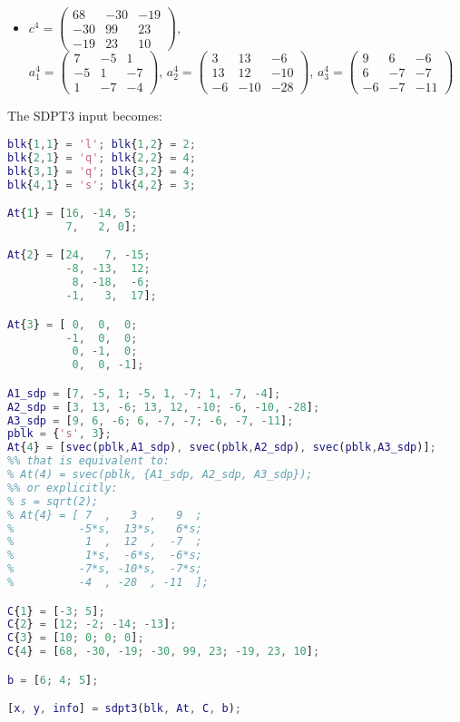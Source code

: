 \begin{example}
\begin{itemize}
    \item $c^4 = \begin{pmatrix} 68 & -30 & -19 \\ -30 & 99 & 23 \\ -19 & 23 & 10 \end{pmatrix}$, \\
    $a^4_1 = \begin{pmatrix} 7 & -5 & 1 \\ -5 & 1 & -7 \\ 1 & -7 & -4 \end{pmatrix}$, 
    $a^4_2 = \begin{pmatrix} 3 & 13 & -6 \\ 13 & 12 & -10 \\ -6 & -10 & -28 \end{pmatrix}$, 
    $a^4_3 = \begin{pmatrix} 9 & 6 & -6 \\ 6 & -7 & -7 \\ -6 & -7 & -11 \end{pmatrix}$
\end{itemize}

The SDPT3 input becomes:
\begin{lstlisting}[language=Matlab]
blk{1,1} = 'l'; blk{1,2} = 2;
blk{2,1} = 'q'; blk{2,2} = 4;
blk{3,1} = 'q'; blk{3,2} = 4;
blk{4,1} = 's'; blk{4,2} = 3;

At{1} = [16, -14, 5;
         7,   2, 0];

At{2} = [24,   7, -15;
         -8, -13,  12;
          8, -18,  -6;
         -1,   3,  17];

At{3} = [ 0,  0,  0;
         -1,  0,  0;
          0, -1,  0;
          0,  0, -1];

A1_sdp = [7, -5, 1; -5, 1, -7; 1, -7, -4];
A2_sdp = [3, 13, -6; 13, 12, -10; -6, -10, -28];
A3_sdp = [9, 6, -6; 6, -7, -7; -6, -7, -11];
pblk = {'s', 3};
At{4} = [svec(pblk,A1_sdp), svec(pblk,A2_sdp), svec(pblk,A3_sdp)];
%% that is equivalent to:
% At(4) = svec(pblk, {A1_sdp, A2_sdp, A3_sdp});
%% or explicitly:
% s = sqrt(2);
% At{4} = [ 7  ,   3  ,   9  ;
%          -5*s,  13*s,   6*s;
%           1  ,  12  ,  -7  ;
%           1*s,  -6*s,  -6*s;
%          -7*s, -10*s,  -7*s;
%          -4  , -28  , -11  ];

C{1} = [-3; 5];
C{2} = [12; -2; -14; -13];
C{3} = [10; 0; 0; 0];
C{4} = [68, -30, -19; -30, 99, 23; -19, 23, 10];

b = [6; 4; 5];

[x, y, info] = sdpt3(blk, At, C, b);
\end{lstlisting}
\end{example}